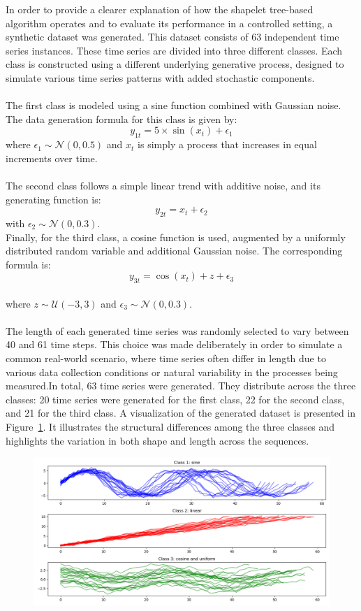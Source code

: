 In order to provide a clearer explanation of how the shapelet tree-based algorithm operates and to evaluate its performance in a controlled setting, a synthetic dataset was generated. This dataset consists of 63 independent time series instances. These time series are divided into three different classes. Each class is constructed using a different underlying generative process, designed to simulate various time series patterns with added stochastic components.\\
\\
The first class is modeled using a sine function combined with Gaussian noise. The data generation formula for this class is given by:
$$
y_{1t}=5\times \sin(x_t)+\epsilon_1
$$
where $\epsilon_1 \sim \mathcal{N}(0, 0.5)$ and $x_t$ is simply a process that increases in equal increments over time.\\
\\
The second class follows a simple linear trend with additive noise, and its generating function is:\\
$$
y_{2t}=x_t+\epsilon_2
$$
with $\epsilon_2 \sim \mathcal{N}(0, 0.3)$. \\
Finally, for the third class, a cosine function is used, augmented by a uniformly distributed random variable and additional Gaussian noise. The corresponding formula is:\\
$$
y_{3t}=\cos(x_t)+z+\epsilon_3
$$\\
where $z \sim \mathcal{U}(-3, 3)$ and $\epsilon_3 \sim \mathcal{N}(0, 0.3)$.\\
\\
The length of each generated time series was randomly selected to vary between 40 and 61 time steps. This choice was made deliberately in order to simulate a common real-world scenario, where time series often differ in length due to various data collection conditions or natural variability in the processes being measured.In total, 63 time series were generated. They distribute across the three classes: 20 time series were generated for the first class, 22 for the second class, and 21 for the third class. A visualization of the generated dataset is presented in Figure~\ref{fig:Training}. It illustrates the structural differences among the three classes and highlights the variation in both shape and length across the sequences.\\
\begin{figure}[h!]
	\centering
	\includegraphics[width=0.9\linewidth]{../Statistical_Sciences_template/figure/Times Series of Three Classes.png}
	\caption{}
	\label{fig:Training}
\end{figure}

